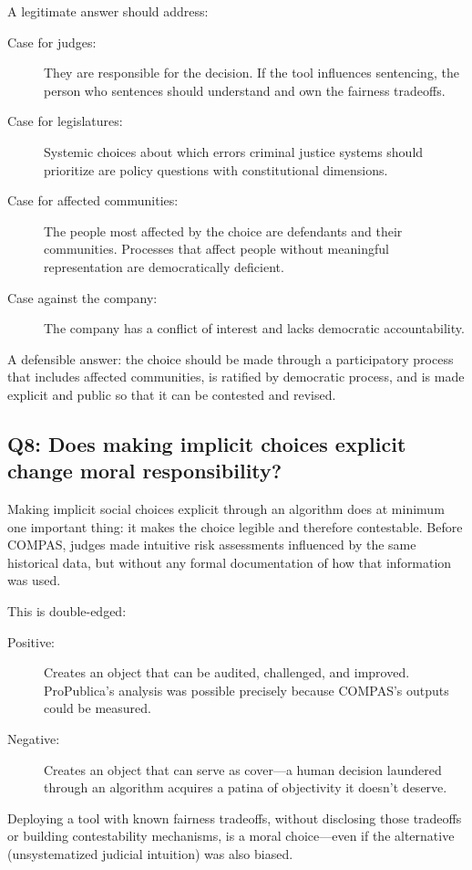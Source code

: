 A legitimate answer should address:

\begin{description}
    \item[Case for judges:] They are responsible for the decision. If the tool influences sentencing, the person who sentences should understand and own the fairness tradeoffs.
    \item[Case for legislatures:] Systemic choices about which errors criminal justice systems should prioritize are policy questions with constitutional dimensions.
    \item[Case for affected communities:] The people most affected by the choice are defendants and their communities. Processes that affect people without meaningful representation are democratically deficient.
    \item[Case against the company:] The company has a conflict of interest and lacks democratic accountability.
\end{description}

A defensible answer: the choice should be made through a participatory process that includes affected communities, is ratified by democratic process, and is made explicit and public so that it can be contested and revised.

\subsection*{Q8: Does making implicit choices explicit change moral responsibility?}

Making implicit social choices explicit through an algorithm does at minimum one important thing: it makes the choice legible and therefore contestable. Before COMPAS, judges made intuitive risk assessments influenced by the same historical data, but without any formal documentation of how that information was used.

This is double-edged:
\begin{description}
    \item[Positive:] Creates an object that can be audited, challenged, and improved. ProPublica's analysis was possible precisely because COMPAS's outputs could be measured.
    \item[Negative:] Creates an object that can serve as cover---a human decision laundered through an algorithm acquires a patina of objectivity it doesn't deserve.
\end{description}

Deploying a tool with known fairness tradeoffs, without disclosing those tradeoffs or building contestability mechanisms, is a moral choice---even if the alternative (unsystematized judicial intuition) was also biased.

